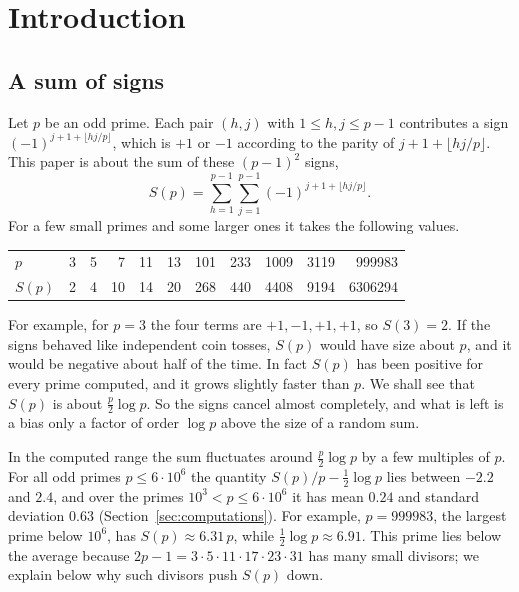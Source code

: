 \providecommand{\sgn}{\operatorname{sgn}}
\providecommand{\dpar}[1]{(\!(#1)\!)}   %
\makeatletter
\providecommand{\setlabeltext}[1]{\phantomsection\protected@edef\@currentlabel{#1}}
\makeatother

\section{Introduction}\label{sec:intro}

\subsection*{A sum of signs}
Let $p$ be an odd prime. Each pair $(h,j)$ with $1\le h,j\le p-1$ contributes a sign $(-1)^{j+1+\lfloor hj/p\rfloor}$, which is $+1$ or $-1$ according to the parity of $j+1+\lfloor hj/p\rfloor$. This paper is about the sum of these $(p-1)^2$ signs,
\[
S(p)=\sum_{h=1}^{p-1}\sum_{j=1}^{p-1}(-1)^{j+1+\lfloor hj/p\rfloor}.
\]
For a few small primes and some larger ones it takes the following values.
\begin{center}\small
\begin{tabular}{l*{10}{r}}
\toprule
$p$ & 3 & 5 & 7 & 11 & 13 & 101 & 233 & 1009 & 3119 & 999983\\
$S(p)$ & 2 & 4 & 10 & 14 & 20 & 268 & 440 & 4408 & 9194 & 6306294\\
\bottomrule
\end{tabular}
\end{center}
For example, for $p=3$ the four terms are $+1,-1,+1,+1$, so $S(3)=2$. If the signs behaved like independent coin tosses, $S(p)$ would have size about $p$, and it would be negative about half of the time. In fact $S(p)$ has been positive for every prime computed, and it grows slightly faster than $p$. We shall see that $S(p)$ is about $\frac p2\log p$. So the signs cancel almost completely, and what is left is a bias only a factor of order $\log p$ above the size of a random sum.

In the computed range the sum fluctuates around $\frac p2\log p$ by a few multiples of $p$. For all odd primes $p\le6\cdot10^6$ the quantity $S(p)/p-\frac12\log p$ lies between $-2.2$ and $2.4$, and over the primes $10^3<p\le6\cdot10^6$ it has mean $0.24$ and standard deviation $0.63$ (Section~\ref{sec:computations}). For example, $p=999983$, the largest prime below $10^6$, has $S(p)\approx6.31\,p$, while $\frac12\log p\approx6.91$. This prime lies below the average because $2p-1=3\cdot5\cdot11\cdot17\cdot23\cdot31$ has many small divisors; we explain below why such divisors push $S(p)$ down.

